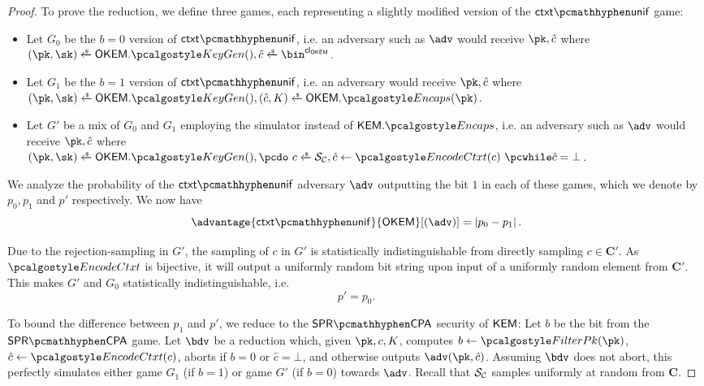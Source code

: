 \begin{proof}
    To prove the reduction, we define three games, each representing a slightly modified version of the $\ctxtunif$ game:
    \begin{itemize}
        \item Let $G_0$ be the $b=0$ version of $\ctxtunif$, i.e. an adversary such as $\adv$ would receive $\pk, \hat c$ where 
        $(\pk,\sk) \getsr \OKEM.\kgen(), \hat c \getsr \bin^\obfctxtlen$.
        \item Let $G_1$ be the $b=1$ version of $\ctxtunif$, i.e. an adversary would receive $\pk, \hat c$ where\\
        $(\pk,\sk) \getsr \OKEM.\kgen(), (\hat c, K) \getsr \OKEM.\encaps(\pk)$.
        \item Let $G'$ be a mix of $G_0$ and $G_1$ employing the simulator instead of $\KEM.\encaps$, i.e. an adversary such as $\adv$ would receive $\pk, \hat c$ where\\
        $(\pk,\sk) \getsr \OKEM.\kgen(), \pcdo\ c \getsr \simulunif, \hat c \gets \encodectxt(c)\ \pcwhile \hat c = \bot$.
    \end{itemize}

    We analyze the probability of the $\ctxtunif$ adversary $\adv$ outputting the bit $1$ in each of these games, which we denote by $p_0, p_1$ and $p'$ respectively.
    We now have
    \[
        \advantage{\ctxtunif}{\OKEM}[(\adv)] = \left| p_0 - p_1 \right|.
    \]

    Due to the rejection-sampling in $G'$, the sampling of $c$ in $G'$ is statistically indistinguishable from directly sampling $c \in \mathbf{C}'$. As $\encodectxt$ is bijective, it will output a uniformly random bit string upon input of a uniformly random element from $\mathbf{C}'$. This makes $G'$ and $G_0$ statistically indistinguishable, i.e.
    \[ p' = p_0. \]

    To bound the difference between $p_1$ and $p'$, we reduce to the $\sprcpa$ security of $\mathsf{KEM}$:
    Let $b$ be the bit from the $\sprcpa$ game. Let $\bdv$ be a reduction which, given $\pk, c, K$, computes $b \gets \filterpk(\pk)$, $\hat c \gets \encodectxt(c)$, aborts if $b=0$ or $\hat c = \bot$, and otherwise outputs $\adv(\pk, \hat c)$.
    Assuming $\bdv$ does not abort, this perfectly simulates either game $G_1$ (if $b=1$) or game $G'$ (if $b=0$) towards $\adv$. Recall that $\mathcal{S}_\mathcal{C}$ samples uniformly at random from $\mathbf{C}$.
    

\end{proof}
